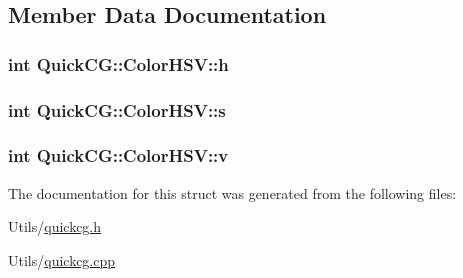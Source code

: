 \subsection{Member Data Documentation}
\hypertarget{structQuickCG_1_1ColorHSV_acbf27d11c4aab9e11e140c0b2e3cab72}{
\subsubsection[{h}]{\setlength{\rightskip}{0pt plus 5cm}int Quick\-C\-G\-::\-Color\-H\-S\-V\-::h}}\label{structQuickCG_1_1ColorHSV_acbf27d11c4aab9e11e140c0b2e3cab72}
\hypertarget{structQuickCG_1_1ColorHSV_a458b4a97b9351221f01245e11460d4db}{
\subsubsection[{s}]{\setlength{\rightskip}{0pt plus 5cm}int Quick\-C\-G\-::\-Color\-H\-S\-V\-::s}}\label{structQuickCG_1_1ColorHSV_a458b4a97b9351221f01245e11460d4db}
\hypertarget{structQuickCG_1_1ColorHSV_ab7c052e520eb5bdaa196568da3f015a1}{
\subsubsection[{v}]{\setlength{\rightskip}{0pt plus 5cm}int Quick\-C\-G\-::\-Color\-H\-S\-V\-::v}}\label{structQuickCG_1_1ColorHSV_ab7c052e520eb5bdaa196568da3f015a1}


The documentation for this struct was generated from the following files\-:\begin{DoxyCompactItemize}
\item 
Utils/\hyperlink{quickcg_8h}{quickcg.\-h}\item 
Utils/\hyperlink{quickcg_8cpp}{quickcg.\-cpp}\end{DoxyCompactItemize}
